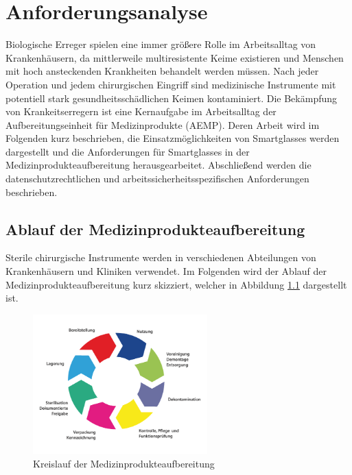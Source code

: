 %
%
%
%
%
%
\chapter{Anforderungsanalyse}
\label{ch:Anforderungsanalyse}
Biologische Erreger spielen eine immer größere Rolle im Arbeitsalltag von Krankenhäusern, da mittlerweile multiresistente Keime existieren \cite{Niknam2017} und Menschen mit hoch ansteckenden Krankheiten behandelt werden müssen. Nach jeder Operation und jedem chirurgischen Eingriff sind medizinische Instrumente mit potentiell stark gesundheitsschädlichen Keimen kontaminiert. Die Bekämpfung von Krankeitserregern ist eine Kernaufgabe im Arbeitsalltag der Aufbereitungseinheit für Medizinprodukte (AEMP). Deren Arbeit wird im Folgenden kurz beschrieben, die Einsatzmöglichkeiten von Smartglasses werden dargestellt und die Anforderungen für Smartglasses in der Medizinprodukteaufbereitung herausgearbeitet. Abschließend werden die datenschutzrechtlichen und arbeitssicherheitsspezifischen Anforderungen beschrieben.
%
%
%
%
%
%
\section{Ablauf der Medizinprodukteaufbereitung}
\label{sec:Ablauf_der_Medizinprodukteaufbereitung}
Sterile chirurgische Instrumente werden in verschiedenen Abteilungen von Krankenhäusern und Kliniken verwendet. Im Folgenden wird der Ablauf der Medizinprodukteaufbereitung kurz skizziert, welcher in Abbildung \ref{fig:Ablauf_der_Medizinprodukteaufbereitung} dargestellt ist.
%
\begin{figure}[htbp]
    \centering
    \includegraphics[width=0.6\textwidth]{data/bilder/kreislauf-ZSVA.png}
    \caption{Kreislauf der Medizinprodukteaufbereitung \cite{AKI-ArbeitskreisInstrumenten-Aufbereitung2012}}
    \label{fig:Ablauf_der_Medizinprodukteaufbereitung}
\end{figure}

